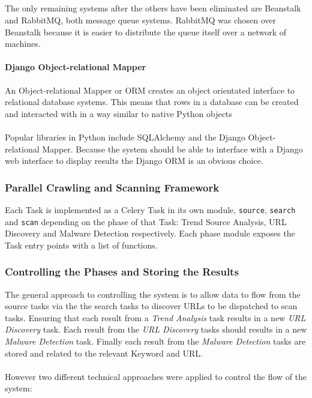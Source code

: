 \subparagraph{}
The only remaining systems after the others have been eliminated are Beanstalk and RabbitMQ, both message queue systems. RabbitMQ was chosen over Beanstalk because it is easier to distribute the queue itself over a network of machines.

\paragraph{Django Object-relational Mapper}
An Object-relational Mapper or ORM creates an object orientated interface to relational database systems.  This means that rows in a database can be created and interacted with in a way similar to native Python objects

\paragraph{}
Popular libraries in Python include SQLAlchemy and the Django Object-relational Mapper. Because the system should be able to interface with a Django web interface to display results the Django ORM is an obvious choice.

\subsubsection{Parallel Crawling and Scanning Framework}
Each Task is implemented as a Celery Task in its own module, \verb`source`, \verb`search` and \verb`scan` depending on the phase of that Task: Trend Source Analysis, URL Discovery and Malware Detection respectively. Each phase module exposes the Task entry points with a list of functions.

\subsubsection{Controlling the Phases and Storing the Results}
The general approach to controlling the system is to allow data to flow from the source tasks via the the search tasks to discover URLs to be dispatched to scan tasks. Ensuring that each result from a \emph{Trend Analysis} task results in a new \emph{URL Discovery} task.  Each result from the \emph{URL Discovery} tasks should results in a new \emph{Malware Detection} task.  Finally each result from the \emph{Malware Detection} tasks are stored and related to the relevant Keyword and URL.

\paragraph{}
However two different technical approaches were applied to control the flow of the system:

